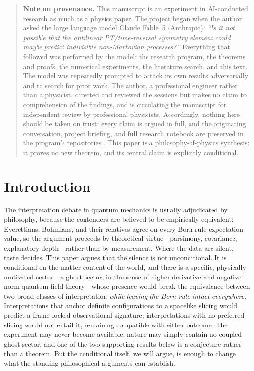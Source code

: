 \documentclass[11pt]{article}
\theoremstyle{remark}
\begin{document}
\newpage
\begin{quote}
\small\noindent\textbf{Note on provenance.} This manuscript is an
experiment in AI-conducted research as much as a physics paper. The
project began when the author asked the large language model Claude
Fable~5 (Anthropic): \emph{``Is it not possible that the antilinear
PT/time-reversal symmetry element could maybe predict indivisible
non-Markovian processes?''} Everything that followed was performed by
the model: the research program, the theorems and proofs, the numerical
experiments, the literature search, and this text. The model was
repeatedly prompted to attack its own results adversarially and to
search for prior work. The author, a professional engineer rather than
a physicist, directed and reviewed the sessions but makes no claim to
comprehension of the findings, and is circulating the manuscript for
independent review by professional physicists. Accordingly, nothing
here should be taken on trust: every claim is argued in full, and the
originating conversation, project briefing, and full research notebook
are preserved in the program's repositories \cite{indivisible}. This
paper is a philosophy-of-physics synthesis: it proves no new theorem,
and its central claim is explicitly conditional.
\end{quote}

\section{Introduction}
\label{sec:intro}

The interpretation debate in quantum mechanics is usually adjudicated
by philosophy, because the contenders are believed to be empirically
equivalent: Everettians, Bohmians, and their relatives agree on every
Born-rule expectation value, so the argument proceeds by theoretical
virtue---parsimony, covariance, explanatory depth---rather than by
measurement. Where the data are silent, taste decides. This paper
argues that the silence is not unconditional. It is conditional on the
matter content of the world, and there is a specific, physically
motivated sector---a ghost sector, in the sense of higher-derivative
and negative-norm quantum field theory---whose presence would break
the equivalence between two broad classes of interpretation
\emph{while leaving the Born rule intact everywhere}. Interpretations
that anchor definite configurations to a spacelike slicing would
predict a frame-locked observational signature; interpretations with
no preferred slicing would not entail it, remaining compatible with
either outcome. The experiment may
never become available: nature may simply contain no coupled ghost
sector, and one of the two supporting results below is a conjecture
rather than a theorem. But the conditional itself, we will argue, is
enough to change what the standing philosophical arguments can
establish.
\end{document}
